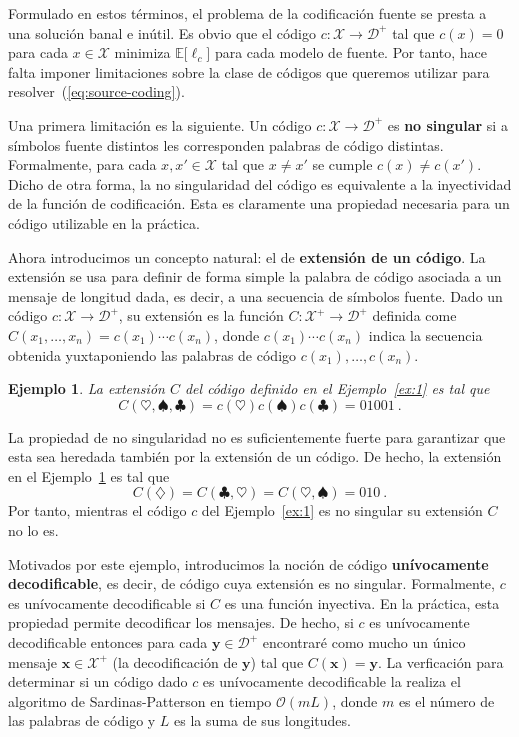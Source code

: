 \documentclass[11pt]{article}
\newtheorem{example}[theorem]{Ejemplo}
\newcommand{\bx}{ \boldsymbol{x} }
\newcommand{\by}{ \boldsymbol{y} }
\newcommand{\scD}{\mathcal{D}}
\newcommand{\scX}{\mathcal{X}}
\newcommand{\field}[1]{\mathbb{#1}}
\newcommand{\E}{\field{E}}
\begin{document}
Formulado en estos términos, el problema de la codificación fuente se presta a una solución banal e inútil. Es obvio que el código $c : \scX\to\scD^+$ tal que $c(x)=0$ para cada $x\in\scX$ minimiza $\E\bigl[\ell_c\bigr]$ para cada modelo de fuente. Por tanto, hace falta imponer limitaciones sobre la clase de códigos que queremos utilizar para resolver~(\ref{eq:source-coding}).

Una primera limitación es la siguiente. Un código $c : \scX\to\scD^+$ es \textbf{no singular} si a símbolos fuente distintos les corresponden palabras de código distintas. Formalmente, para cada $x,x'\in\scX$ tal que $x \neq x'$ se cumple $c(x) \neq c(x')$. Dicho de otra forma, la no singularidad del código es equivalente a la inyectividad de la función de codificación. Esta es claramente una propiedad necesaria para un código utilizable en la práctica.

Ahora introducimos un concepto natural: el de \textbf{extensión de un código}. La extensión se usa para definir de forma simple la palabra de código asociada a un mensaje de longitud dada, es decir, a una secuencia de símbolos fuente. Dado un código $c : \scX\to\scD^+$, su extensión es la función $C : \scX^+\to\scD^+$ definida come
$
    C(x_1,\dots,x_n) = c(x_1) \cdots c(x_n)
$, donde $c(x_1) \cdots c(x_n)$ indica la secuencia obtenida yuxtaponiendo las palabras de código $c(x_1),\dots,c(x_n)$.
%
\begin{example}
\label{ex:2}
La extensión $C$ del código definido en el Ejemplo~\ref{ex:1} es tal que
\[
    C(\heartsuit,\spadesuit,\clubsuit) = c(\heartsuit)c(\spadesuit)c(\clubsuit) = 01001~.
\]
\end{example}
%
La propiedad de no singularidad no es suficientemente fuerte para garantizar que esta sea heredada también por la extensión de un código. De hecho, la extensión en el Ejemplo~\ref{ex:2} es tal que
\[
    C(\diamondsuit) = C(\clubsuit,\heartsuit) = C(\heartsuit,\spadesuit) = 010~.
\]
Por tanto, mientras el código $c$ del Ejemplo~\ref{ex:1} es no singular su extensión $C$ no lo es.

Motivados por este ejemplo, introducimos la noción de código \textbf{unívocamente decodificable}, es decir, de código cuya extensión es no singular. Formalmente, $c$ es unívocamente decodificable si $C$ es una función inyectiva. En la práctica, esta propiedad permite decodificar los mensajes. De hecho, si $c$ es unívocamente decodificable entonces para cada $\by\in\scD^+$ encontraré como mucho un único mensaje $\bx\in\scX^+$ (la decodificación de $\by$) tal que $C(\bx) = \by$. La verficación para determinar si un código dado $c$ es unívocamente decodificable la realiza el algoritmo de Sardinas-Patterson en tiempo $\mathcal{O}(mL)$, donde $m$ es el número de las palabras de código y $L$ es la suma de sus longitudes.
\end{document}
